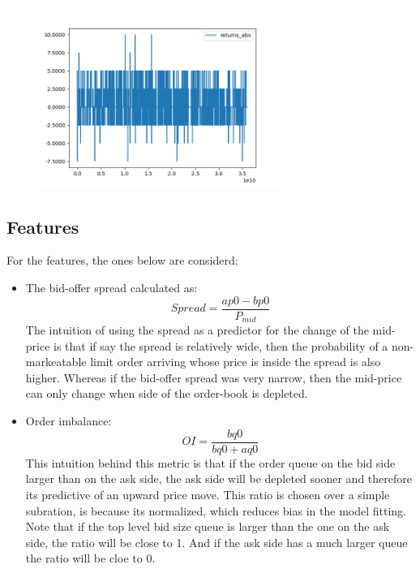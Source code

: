 \documentclass[english, 11pt, a4paper]{article}
\begin{document}
 \begin{figure}[H] 
	\centering
	\includegraphics[width=0.70\textwidth]{../data/figures/time_series_20190610_returns_abs.png}
	\caption{}
	\label{fig3}
\end{figure}

\subsection{Features}
For the features, the ones below are considerd:
\begin{itemize}
    \item The bid-offer spread calculated as:
        \begin{equation}
            Spread = \frac{ap0 - bp0}{P_{mid}}
        \end{equation}
    The intuition of using the spread as a predictor for the change of the mid-price is that if say
    the spread is relatively wide, then the probability of a non-markeatable limit order
    arriving whose price is inside the spread is also higher. Whereas if the bid-offer spread was very
    narrow, then the mid-price can only change when side of the order-book is depleted.
    \item Order imbalance: 
        \begin{equation}
            OI = \frac{bq0}{bq0+aq0} 
        \end{equation}
    This intuition behind this metric is that if the order queue on the bid side larger than on the
    ask side, the ask side will be depleted sooner and therefore its predictive of an upward
    price move. This ratio is chosen over a simple subration, is because its normalized, which
    reduces bias in the model fitting. Note that if the top level bid size queue is larger than the
        one on the ask side, the ratio will be close to 1. And if the ask side has a much larger
        queue the ratio will be cloe to 0.
\end{itemize}
\end{document}
